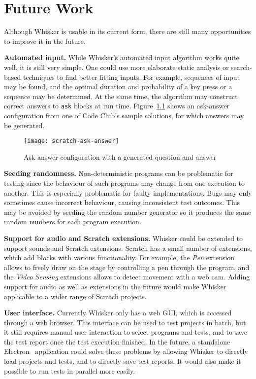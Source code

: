 \chapter{Future Work}
\label{cha:future_work}

Although Whisker is usable in its current form,
there are still many opportunities to improve it in the future.
\parspace

\textbf{Automated input.}
While Whisker's automated input algorithm works quite well, it is still very simple.
One could use more elaborate static analysis or search-based techniques to find better fitting inputs.
For example, sequences of input may be found, and the optimal duration and probability of a key press or a sequence may be determined.
At the same time, the algorithm may construct correct answers to \texttt{ask} blocks at run time.
Figure~\ref{fig:generated_ask_answer} shows an ask-answer configuration from one of Code Club's sample solutions,
for which answers may be generated.

\begin{figure}[htpb]
    \centering
    \texttt{[image: scratch-ask-answer]}
    \caption{Ask-answer configuration with a generated question and answer}
    \label{fig:generated_ask_answer}
\end{figure}

\textbf{Seeding randomness.}
Non-deterministic programs can be problematic for testing since the behaviour of such programs may change from one execution to another.
This is especially problematic for faulty implementations.
Bugs may only sometimes cause incorrect behaviour, causing inconsistent test outcomes.
This may be avoided by seeding the random number generator so it produces the same random numbers for each program execution.
\parspace

\textbf{Support for audio and Scratch extensions.}
Whisker could be extended to support sounds and Scratch extensions.
Scratch has a small number of extensions, which add blocks with various functionality.
For example, the \textit{Pen} extension allows to freely draw on the stage by controlling a pen through the program,
and the \textit{Video Sensing} extensions allows to detect movement with a web cam.
Adding support for audio as well as extensions in the future would make Whisker applicable to a wider range of Scratch projects.
\parspace

\textbf{User interface.}
Currently Whisker only has a web GUI, which is accessed through a web browser.
This interface can be used to test projects in batch, but it still requires manual user interaction to select programs and tests,
and to save the test report once the test execution finished.
In the future, a standalone Electron~\cite{electron} application could solve these problems by allowing Whisker to directly load projects and tests,
and to directly save test reports.
It would also make it possible to run tests in parallel more easily.
\parspace

